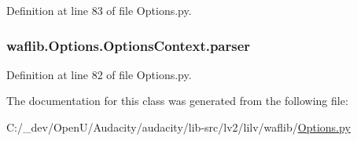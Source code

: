 Definition at line 83 of file Options.\+py.

\subsubsection[{\texorpdfstring{parser}{parser}}]{\setlength{\rightskip}{0pt plus 5cm}waflib.\+Options.\+Options\+Context.\+parser}\hypertarget{classwaflib_1_1_options_1_1_options_context_ab0b0a70ff279d9095a304f9c0fb2a095}{}\label{classwaflib_1_1_options_1_1_options_context_ab0b0a70ff279d9095a304f9c0fb2a095}


Definition at line 82 of file Options.\+py.



The documentation for this class was generated from the following file\+:\begin{DoxyCompactItemize}
\item 
C\+:/\+\_\+dev/\+Open\+U/\+Audacity/audacity/lib-\/src/lv2/lilv/waflib/\hyperlink{lilv_2waflib_2_options_8py}{Options.\+py}\end{DoxyCompactItemize}
